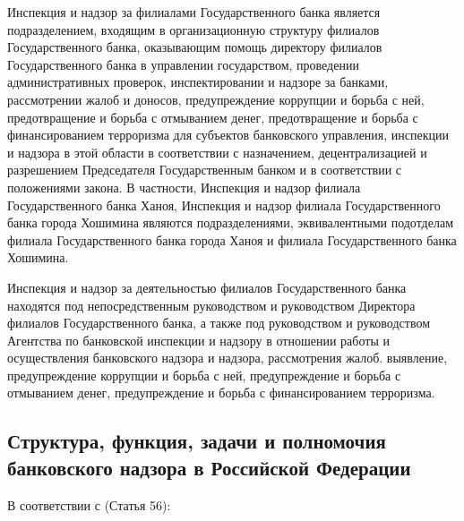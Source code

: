 \documentclass{article}
\begin{document}
Инспекция и надзор за филиалами Государственного банка является подразделением, входящим в организационную структуру филиалов Государственного банка, оказывающим помощь директору филиалов Государственного банка в управлении государством, проведении административных проверок, инспектировании и надзоре за банками, рассмотрении жалоб и доносов, предупреждение коррупции и борьба с ней, предотвращение и борьба с отмыванием денег, предотвращение и борьба с финансированием терроризма для субъектов банковского управления, инспекции и надзора в этой области в соответствии с назначением, децентрализацией и разрешением Председателя Государственным банком и в соответствии с положениями закона. В частности, Инспекция и надзор филиала Государственного банка Ханоя, Инспекция и надзор филиала Государственного банка города Хошимина являются подразделениями, эквивалентными подотделам филиала Государственного банка города Ханоя и филиала Государственного банка Хошимина.

Инспекция и надзор за деятельностью филиалов Государственного банка находятся под непосредственным руководством и руководством Директора филиалов Государственного банка, а также под руководством и руководством Агентства по банковской инспекции и надзору в отношении работы и осуществления банковского надзора и надзора, рассмотрения жалоб. выявление, предупреждение коррупции и борьба с ней, предупреждение и борьба с отмыванием денег, предупреждение и борьба с финансированием терроризма.

\hfill

\subsection{Структура, функция, задачи и полномочия банковского надзора в Российской Федерации}

В соответствии с \cite{fz86} (Статья 56):
\end{document}
